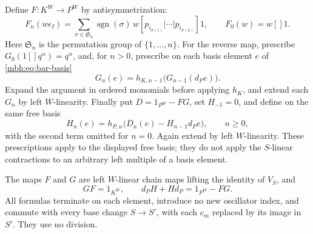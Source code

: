 Define \(F:K^W\to P^W\) by antisymmetrization:
\begin{equation}\label{mbh:eq:antisymmetrization}
 F_n(w\epsilon_I)=
 \sum_{\sigma\in\mathfrak S_n}\operatorname{sgn}(\sigma)\,
 w[p_{i_{\sigma(1)}}|\cdots|p_{i_{\sigma(n)}}]1,
 \qquad F_0(w)=w[]1.
\end{equation}
Here \(\mathfrak S_n\) is the permutation group of \(\{1,\ldots,n\}\).
For the reverse map, prescribe
\(G_0(1[]q^\alpha)=q^\alpha\), and, for \(n>0\), prescribe
on each basis element \(e\) of \eqref{mbh:eq:bar-basis}
\begin{equation}\label{mbh:eq:reverse-recursion}
 G_n(e)=h_{K,n-1}\bigl(G_{n-1}(d_Pe)\bigr).
\end{equation}
Expand the argument in ordered monomials before applying \(h_K\),
and extend each \(G_n\) by left \(W\)-linearity.
Finally put \(D=1_{P^W}-FG\), set \(H_{-1}=0\), and define
on the same free basis
\begin{equation}\label{mbh:eq:bar-homotopy-recursion}
 H_n(e)=h_{P,n}\bigl(D_n(e)-H_{n-1}d_Pe\bigr),
 \qquad n\ge0,
\end{equation}
with the second term omitted for \(n=0\).
Again extend by left \(W\)-linearity.  These prescriptions apply
to the displayed free basis; they do not apply the \(S\)-linear
contractions to an arbitrary left multiple of a basis element.

\begin{theorem}
\label{mbh:thm:retraction}
The maps \(F\) and \(G\) are left \(W\)-linear chain maps lifting
the identity of \(V_S\), and
\begin{equation}\label{mbh:eq:retraction-identities}
 GF=1_{K^W},\qquad d_PH+Hd_P=1_{P^W}-FG.
\end{equation}
All formulas terminate on each element, introduce no new oscillator
index, and commute with every base change \(S\to S'\), with each
\(c_m\) replaced by its image in \(S'\).  They use no division.
\end{theorem}

